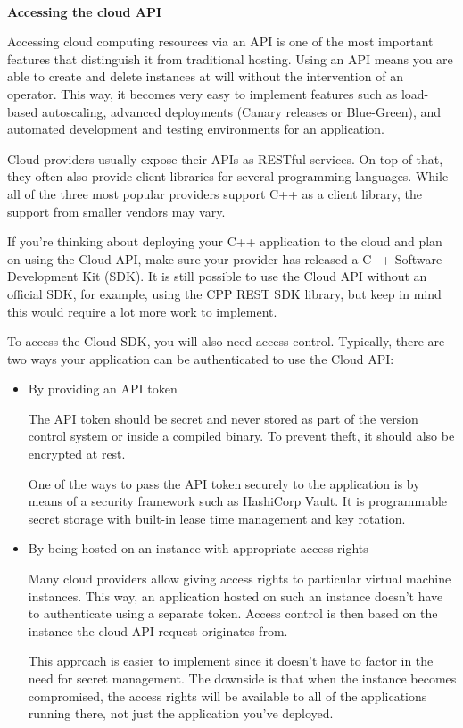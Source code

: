 \hspace*{\fill} \\ %
\noindent
\textbf{Accessing the cloud API}

Accessing cloud computing resources via an API is one of the most important features that distinguish it from traditional hosting. Using an API means you are able to create and delete instances at will without the intervention of an operator. This way, it becomes very easy to implement features such as load-based autoscaling, advanced deployments (Canary releases or Blue-Green), and automated development and testing environments for an application.

Cloud providers usually expose their APIs as RESTful services. On top of that, they often also provide client libraries for several programming languages. While all of the three most popular providers support C++ as a client library, the support from smaller vendors may vary.

If you're thinking about deploying your C++ application to the cloud and plan on using the Cloud API, make sure your provider has released a C++ Software Development Kit (SDK). It is still possible to use the Cloud API without an official SDK, for example, using the CPP REST SDK library, but keep in mind this would require a lot more work to implement. 

To access the Cloud SDK, you will also need access control. Typically, there are two ways your application can be authenticated to use the Cloud API:

\begin{itemize}
\item 
By providing an API token

The API token should be secret and never stored as part of the version control system or inside a compiled binary. To prevent theft, it should also be encrypted at rest.

One of the ways to pass the API token securely to the application is by means of a security framework such as HashiCorp Vault. It is programmable secret storage with built-in lease time management and key rotation.

\item 
By being hosted on an instance with appropriate access rights

Many cloud providers allow giving access rights to particular virtual machine instances. This way, an application hosted on such an instance doesn't have to authenticate using a separate token. Access control is then based on the instance the cloud API request originates from.

This approach is easier to implement since it doesn't have to factor in the need for secret management. The downside is that when the instance becomes compromised, the access rights will be available to all of the applications running there, not just the application you've deployed.
\end{itemize}


